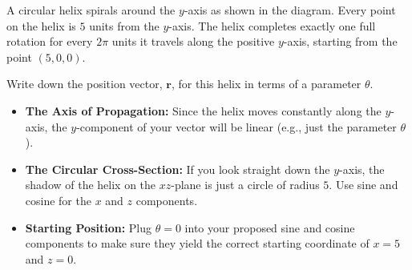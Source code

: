 \begin{problem}
\begin{minipage}{0.55\textwidth}
A circular helix spirals around the $y$-axis as shown in the diagram. Every point on the helix is $5$ units from the $y$-axis. The helix completes exactly one full rotation for every $2\pi$ units it travels along the positive $y$-axis, starting from the point $(5, 0, 0)$. 

Write down the position vector, $\mathbf{r}$, for this helix in terms of a parameter $\theta$.
\end{minipage}%
\hfill
\begin{minipage}{0.4\textwidth}
\begin{center}
\end{center}
\end{minipage}
\end{problem}

\begin{hint}
\begin{itemize}[leftmargin=*]
    \item \textbf{The Axis of Propagation:} Since the helix moves constantly along the $y$-axis, the $y$-component of your vector will be linear (e.g., just the parameter $\theta$).
    \item \textbf{The Circular Cross-Section:} If you look straight down the $y$-axis, the shadow of the helix on the $xz$-plane is just a circle of radius $5$. Use sine and cosine for the $x$ and $z$ components. 
    \item \textbf{Starting Position:} Plug $\theta = 0$ into your proposed sine and cosine components to make sure they yield the correct starting coordinate of $x=5$ and $z=0$. 
\end{itemize}
\end{hint}

